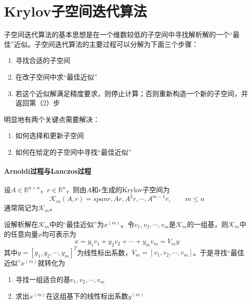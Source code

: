 \documentclass[UTF8]{article}
\begin{document}
\section{Krylov子空间迭代算法}
\begin{flushleft}
子空间迭代算法的基本思想是在一个维数较低的子空间中寻找解析解的一个“最佳”近似。子空间迭代算法的主要过程可以分解为下面三个步骤：
\begin{enumerate}[(1)]
  \item 寻找合适的子空间
  \item 在改子空间中求“最佳近似”
  \item 若这个近似解满足精度要求，则停止计算；否则重新构造一个新的子空间，并返回第（2）步
\end{enumerate}

明显地有两个关键点需要解决：
\begin{enumerate}[(1)]
  \item 如何选择和更新子空间
  \item 如何在给定的子空间中寻找“最佳近似”
\end{enumerate}

\paragraph{Arnoldi过程与Lanczos过程}
设$A \in \mathbb{R}^{n \times n}$，$r \in \mathbb{R}^n$，则由$A$和$r$生成的Krylov子空间为
$$\mathcal{K}_m(A,r)=span{r,Ar,A^2r,\cdots,A^{m-1}r}, \qquad m \leq n$$
通常简记为$\mathcal{K}_m$。\newline

设解析解在$\mathcal{K}_m$中的“最佳近似”为$x^{(m)}$。令$v_1,v_2,\cdots,v_m$是$\mathcal{K}_m$的一组基，则$\mathcal{K}_m$中的任意向量$x$均可表示为
$$x=y_1v_1+y_2v_2+\cdots+y_mv_m=V_my$$
其中$y=[y_1,y_2,\cdots,y_m]^T$为线性标出系数，$V_m=[v_1,v_2,\cdots,v_m]$。于是寻找“最佳近似”$x^{(m)}$就转化为
\begin{enumerate}[(1)]
  \item 寻找一组适合的基$v_1,v_2,\cdots,v_m$
  \item 求出$x^{(m)}$在这组基下的线性标出系数$y^{(m)}$
\end{enumerate}
\end{flushleft}
\end{document}
